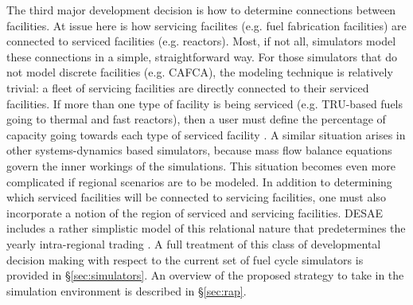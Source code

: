 The third major development decision is how to determine connections between
facilities. At issue here is how servicing facilites (e.g. fuel fabrication
facilities) are connected to serviced facilities (e.g. reactors). Most, if not
all, simulators model these connections in a simple, straightforward way. For
those simulators that do not model discrete facilities (e.g. CAFCA), the
modeling technique is relatively trivial: a fleet of servicing facilities are
directly connected to their serviced facilities. If more than one type of
facility is being serviced (e.g. TRU-based fuels going to thermal and fast
reactors), then a user must define the percentage of capacity going towards each
type of serviced facility \cite{busquim_e_silva_system_2008}. A similar
situation arises in other systems-dynamics based simulators, because mass flow
balance equations govern the inner workings of the simulations. This situation
becomes even more complicated if regional scenarios are to be modeled. In
addition to determining which serviced facilities will be connected to servicing
facilities, one must also incorporate a notion of the region of serviced and
servicing facilities. DESAE includes a rather simplistic model of this
relational nature that predetermines the yearly intra-regional trading
\cite{iaea_nuclear_2010}. A full treatment of this class of developmental
decision making with respect to the current set of fuel cycle simulators is
provided in \S\ref{sec:simulators}. An overview of the proposed strategy to
take in the \Cyclus simulation environment is described in \S\ref{sec:rap}.
